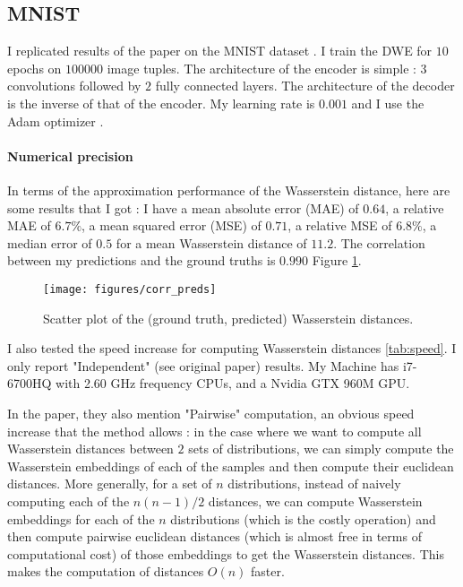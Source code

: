 \documentclass{article}
\begin{document}
\subsection{MNIST}

I replicated results of the paper on the MNIST dataset \cite{lecun-mnisthandwrittendigit-2010}. I train the DWE for $10$ epochs on $100000$ image tuples. The architecture of the encoder is simple : $3$ convolutions followed by $2$ fully connected layers. The architecture of the decoder is the inverse of that of the encoder. My learning rate is $0.001$ and I use the Adam optimizer \cite{kingma2014adam}.

\paragraph{Numerical precision}

In terms of the approximation performance of the Wasserstein distance, here are some results that I got : I have a mean absolute error (MAE) of $0.64$, a relative MAE of $6.7\%$, a mean squared error (MSE) of $0.71$, a relative MSE of $6.8\%$, a median error of $0.5$ for a mean Wasserstein distance of $11.2$. The correlation between my predictions and the ground truths is $0.990$ Figure \ref{fig:corr}.

\begin{figure}[!htb]
	\centering
	\texttt{[image: figures/corr\_preds]}
	\caption{Scatter plot of the (ground truth, predicted) Wasserstein distances.}
	\label{fig:corr}
\end{figure}

I also tested the speed increase for computing Wasserstein distances \ref{tab:speed}. I only report "Independent" (see original paper) results. My Machine has i7-6700HQ with 2.60 GHz frequency CPUs, and a Nvidia GTX 960M GPU.

In the paper, they also mention "Pairwise" computation, an obvious speed increase that the method allows : in the case where we want to compute all Wasserstein distances between $2$ sets of distributions, we can simply compute the Wasserstein embeddings of each of the samples and then compute their euclidean distances. More generally, for a set of $n$ distributions, instead of naively computing each of the $n(n-1)/2$ distances, we can compute Wasserstein embeddings for each of the $n$ distributions (which is the costly operation) and then compute pairwise euclidean distances (which is almost free in terms of computational cost) of those embeddings to get the Wasserstein distances. This makes the computation of distances $O(n)$ faster.
\end{document}
